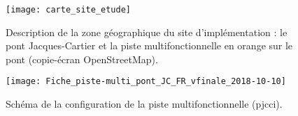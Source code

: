 \begin{figure}[H]
    \centering
    \texttt{[image: carte\_site\_etude]}
    \caption[représentation cartographique du site d'implémentation]{Description de la zone géographique du site d'implémentation : le pont Jacques-Cartier et la piste multifonctionnelle en orange sur le pont (copie-écran OpenStreetMap).}
    \label{fig:carte_site_etude_openstreetmap}
\end{figure}
\begin{figure}[H]
    \centering
    \texttt{[image: Fiche\_piste-multi\_pont\_JC\_FR\_vfinale\_2018-10-10]}
    \caption[Schéma de la configuration de la piste multifonctionnelle]{Schéma de la configuration de la piste multifonctionnelle (\acrshort{pjcci})\protect\footnotemark.}
    \label{fig:Fiche_piste-multi_pont_JC_FR_vfinale_2018-10-10}
\end{figure}
